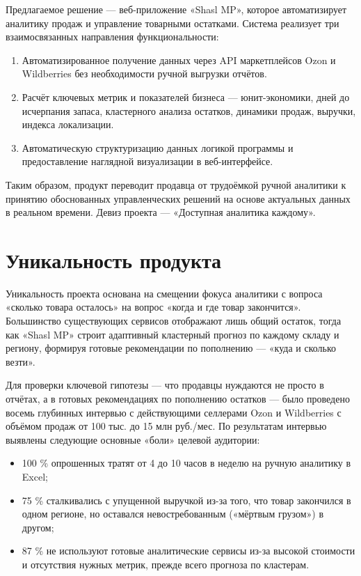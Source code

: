 Предлагаемое решение --- веб-приложение «Shasl MP», которое автоматизирует аналитику продаж и управление товарными остатками. Система реализует три взаимосвязанных направления функциональности:

\begin{enumerate}
\item Автоматизированное получение данных через API маркетплейсов Ozon и Wildberries без необходимости ручной выгрузки отчётов.
\item Расчёт ключевых метрик и показателей бизнеса --- юнит-экономики, дней до исчерпания запаса, кластерного анализа остатков, динамики продаж, выручки, индекса локализации.
\item Автоматическую структуризацию данных логикой программы и предоставление наглядной визуализации в веб-интерфейсе.
\end{enumerate}

Таким образом, продукт переводит продавца от трудоёмкой ручной аналитики к принятию обоснованных управленческих решений на основе актуальных данных в реальном времени. Девиз проекта --- «Доступная аналитика каждому».

\section{Уникальность продукта}

Уникальность проекта основана на смещении фокуса аналитики с вопроса «сколько товара осталось» на вопрос «когда и где товар закончится». Большинство существующих сервисов отображают лишь общий остаток, тогда как «Shasl MP» строит адаптивный кластерный прогноз по каждому складу и региону, формируя готовые рекомендации по пополнению --- «куда и сколько везти».

Для проверки ключевой гипотезы --- что продавцы нуждаются не просто в отчётах, а в готовых рекомендациях по пополнению остатков --- было проведено восемь глубинных интервью с действующими селлерами Ozon и Wildberries с объёмом продаж от 100 тыс. до 15 млн руб./мес. По результатам интервью выявлены следующие основные «боли» целевой аудитории:

\begin{itemize}
\item 100 \% опрошенных тратят от 4 до 10 часов в неделю на ручную аналитику в Excel;
\item 75 \% сталкивались с упущенной выручкой из-за того, что товар закончился в одном регионе, но оставался невостребованным («мёртвым грузом») в другом;
\item 87 \% не используют готовые аналитические сервисы из-за высокой стоимости и отсутствия нужных метрик, прежде всего прогноза по кластерам.
\end{itemize}

